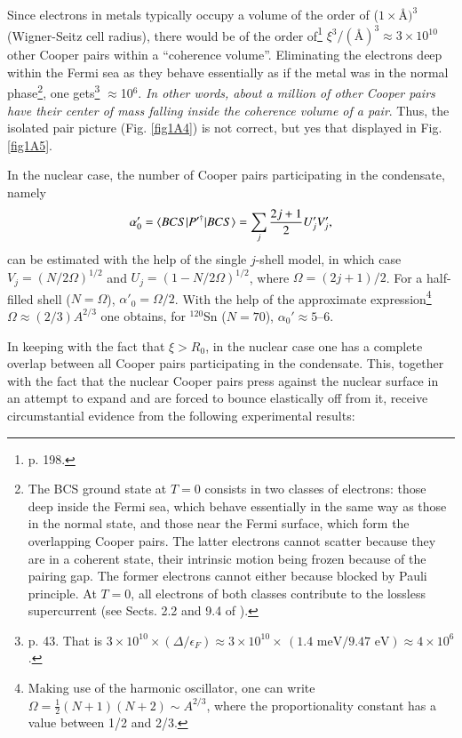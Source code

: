 Since electrons in metals typically occupy a volume of the order of ($1\times$\AA$)^3$ (Wigner-Seitz cell radius), there would be of the order of\footnote{\cite{Ketterson:99} p. 198.} $\xi^3/(\text{\AA})^3\approx 3\times10^{10}$ other Cooper pairs within a ``coherence volume''. Eliminating the electrons deep within the Fermi sea as they behave essentially as if the metal was in the normal phase\footnote{The BCS ground state at $T=0$ consists in two classes of electrons: those deep inside the Fermi sea, which behave essentially in the same way as those in the normal state, and those near the Fermi surface, which form the overlapping Cooper pairs. The latter electrons cannot scatter because they are in a coherent state, their intrinsic motion being frozen because of the pairing gap. The former electrons  cannot either because  blocked by Pauli principle. At $T=0$, all electrons of both classes contribute to the lossless supercurrent (see Sects. 2.2 and 9.4 of \cite{Waldram:96}).}, one gets\footnote{\cite{Schrieffer:64} p. 43.  That is $3\times10^{10}\times(\Delta/\epsilon_F)\approx3\times10^{10}\times\,(1.4\text{ meV}/9.47\text{ eV})\approx 4\times 10^{6}$.} $\approx$10$^6$. \textit{In other words, about a million of other Cooper pairs have their center of mass falling inside the coherence volume of a pair}. Thus, the isolated pair picture (Fig. \ref{fig1A4}) is not correct, but yes that displayed in Fig. \ref{fig1A5}.





 


 In the nuclear case, the number of Cooper pairs participating in the condensate, namely  
 \begin{align}\label{eq3B11}
\alpha'_0=\braket{BCS|P'^\dagger|BCS}=\sum_j\frac{2j+1}{2}U'_jV'_j, \idx{Cooper pair!number of}
 \end{align}
 can be estimated  with the help of the single $j$-shell model, in which case $V_j=(N/2\Omega)^{1/2}$ and $U_j=(1-N/2\Omega)^{1/2}$, where $\Omega=(2j+1)/2$. For a half-filled shell ($N=\Omega$),  $\alpha'_0=\Omega/2$. With the help of the approximate expression\footnote{Making use of the harmonic oscillator, one can write $\Omega=\frac{1}{2}(N+1)(N+2)\sim A^{2/3}$, where the proportionality constant has a value between 1/2 and 2/3.} $\Omega\approx(2/3)A^{2/3}$ one obtains, for $^{120}$Sn ($N=70$), $\alpha_0'\approx5$--6.
 
 
 
 
 In keeping with the fact that $\xi>R_0$, in the nuclear case one has a complete overlap between all Cooper pairs participating in the condensate. This, together with the fact that the nuclear Cooper pairs press against the nuclear surface in an attempt to expand and are forced to bounce elastically off from  it, receive  circumstantial evidence from the following experimental results:
 
